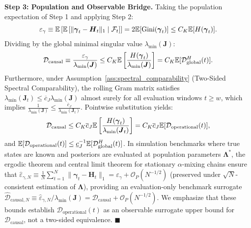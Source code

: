 \textbf{Step 3: Population and Observable Bridge.}
Taking the population expectation of Step 1 and applying Step 2:
\begin{equation}
    \varepsilon_\gamma \equiv \mathbb{E}\left[ \mathbb{E}\left[ \|\boldsymbol{\gamma}_t - \boldsymbol{H}_t\|_1 \;\middle|\; \mathcal{F}_t \right] \right] = 2 \mathbb{E}[\operatorname{Gini}(\boldsymbol{\gamma}_t)] \le C_K \mathbb{E}[H(\boldsymbol{\gamma}_t)].
\end{equation}
Dividing by the global minimal singular value $\lambda_{\min}(\boldsymbol{J})$:
\begin{equation}
    \mathcal{D}_{\mathrm{causal}} \equiv \frac{\varepsilon_\gamma}{\lambda_{\min}(\boldsymbol{J})} \le C_K \mathbb{E}\left[ \frac{H(\boldsymbol{\gamma}_t)}{\lambda_{\min}(\boldsymbol{J})} \right] = C_K \mathbb{E}[\mathcal{D}_{\mathrm{global}}^H(t)].
\end{equation}
Furthermore, under Assumption~\ref{ass:spectral_comparability} (Two-Sided Spectral Comparability), the rolling Gram matrix satisfies $\lambda_{\min}(\boldsymbol{J}_t) \le \overline{c}_J \lambda_{\min}(\boldsymbol{J})$ almost surely for all evaluation windows $t \ge w$, which implies $\frac{1}{\lambda_{\min}(\boldsymbol{J})} \le \frac{\overline{c}_J}{\lambda_{\min}(\boldsymbol{J}_t)}$. Pointwise substitution yields:
\begin{equation}
    \mathcal{D}_{\mathrm{causal}} \le C_K \overline{c}_J \mathbb{E}\left[ \frac{H(\boldsymbol{\gamma}_t)}{\lambda_{\min}(\boldsymbol{J}_t)} \right] = C_K \overline{c}_J \mathbb{E}[\mathcal{D}_{\mathrm{operational}}(t)],
\end{equation}
and $\mathbb{E}[\mathcal{D}_{\mathrm{operational}}(t)] \le \underline{c}_J^{-1} \mathbb{E}[\mathcal{D}_{\mathrm{global}}^H(t)]$. In simulation benchmarks where true states are known and posteriors are evaluated at population parameters $\boldsymbol{\Lambda}^*$, the ergodic theorem and central limit theorem for stationary $\alpha$-mixing chains ensure that $\hat{\varepsilon}_{\gamma, N} \equiv \frac{1}{N}\sum_{t=1}^N \|\boldsymbol{\gamma}_t - \boldsymbol{H}_t\|_1 = \varepsilon_\gamma + \mathcal{O}_P(N^{-1/2})$ (preserved under $\sqrt{N}$-consistent estimation of $\boldsymbol{\Lambda}$), providing an evaluation-only benchmark surrogate $\hat{\mathcal{D}}_{\mathrm{causal}, N} \equiv \hat{\varepsilon}_{\gamma, N}/\lambda_{\min}(\boldsymbol{J}) = \mathcal{D}_{\mathrm{causal}} + \mathcal{O}_P(N^{-1/2})$. We emphasize that these bounds establish $\mathcal{D}_{\mathrm{operational}}(t)$ as an observable surrogate upper bound for $\mathcal{D}_{\mathrm{causal}}$, not a two-sided equivalence. $\blacksquare$

